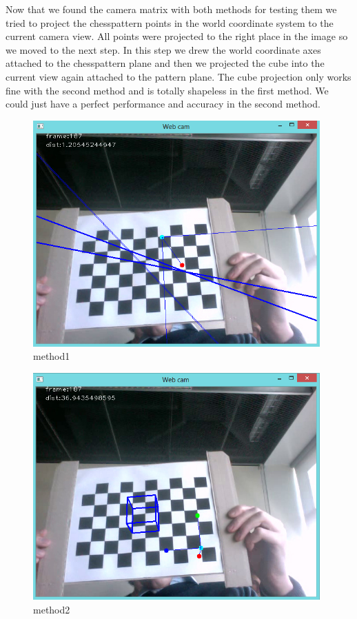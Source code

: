 Now that we found the camera matrix with both methods for testing them we tried to project the chesspattern points in the world coordinate system to the current camera view. All points were projected to the right place in the image so we moved to the next step.
In this step we drew the world coordinate axes attached to the chesspattern plane and then we projected the cube into the current view again attached to the pattern plane. The cube projection only works fine with the second method and is totally shapeless in the first method. We could just have a perfect performance and accuracy in the second method.


 \begin{figure}[h!]
	\centering
	\includegraphics[width=11cm]{Handin3/images/method1.jpg}
	\caption{method1}
	\label{fig:method1}
\end{figure}
 \begin{figure}[h!]
	\centering
	\includegraphics[width=11cm]{Handin3/images/method2.jpg}
	\caption{method2}
	\label{fig:method2}
\end{figure}

